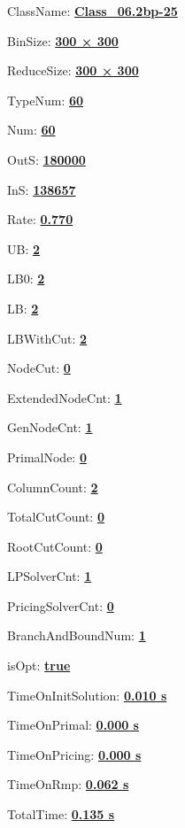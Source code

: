 \documentclass[11pt]{article}
\begin{document}
\pagestyle{empty}


ClassName: \underline{\textbf{Class_06.2bp-25}}
\par
BinSize: \underline{\textbf{300 × 300}}
\par
ReduceSize: \underline{\textbf{300 × 300}}
\par
TypeNum: \underline{\textbf{60}}
\par
Num: \underline{\textbf{60}}
\par
OutS: \underline{\textbf{180000}}
\par
InS: \underline{\textbf{138657}}
\par
Rate: \underline{\textbf{0.770}}
\par
UB: \underline{\textbf{2}}
\par
LB0: \underline{\textbf{2}}
\par
LB: \underline{\textbf{2}}
\par
LBWithCut: \underline{\textbf{2}}
\par
NodeCut: \underline{\textbf{0}}
\par
ExtendedNodeCnt: \underline{\textbf{1}}
\par
GenNodeCnt: \underline{\textbf{1}}
\par
PrimalNode: \underline{\textbf{0}}
\par
ColumnCount: \underline{\textbf{2}}
\par
TotalCutCount: \underline{\textbf{0}}
\par
RootCutCount: \underline{\textbf{0}}
\par
LPSolverCnt: \underline{\textbf{1}}
\par
PricingSolverCnt: \underline{\textbf{0}}
\par
BranchAndBoundNum: \underline{\textbf{1}}
\par
isOpt: \underline{\textbf{true}}
\par
TimeOnInitSolution: \underline{\textbf{0.010 s}}
\par
TimeOnPrimal: \underline{\textbf{0.000 s}}
\par
TimeOnPricing: \underline{\textbf{0.000 s}}
\par
TimeOnRmp: \underline{\textbf{0.062 s}}
\par
TotalTime: \underline{\textbf{0.135 s}}
\par
\newpage
\end{document}
